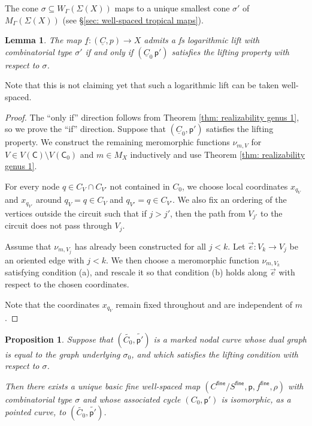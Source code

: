 \documentclass{article}
\newtheorem{proposition}[definition]{Proposition}
\newtheorem{lemma}[definition]{Lemma}
\newcommand{\tropC}{\mathsf{C}}
\begin{document}
The cone $\sigma \subseteq W_\Gamma(\Sigma(X))$ maps to a unique smallest cone $\sigma'$ of $M_{\Gamma}(\Sigma(X))$ (see \S\ref{sec: well-spaced tropical maps}).




\begin{lemma} \label{lem: liftingtrees}
    The map $\underline{f}: (\underline{C},p) \rightarrow X$ admits a fs logarithmic lift with combinatorial type $\sigma'$ if and only if $(\underline{C}_0\, \mathsf{p}')$ satisfies the lifting property with respect to $\sigma$. 
\end{lemma}

Note that this is not claiming yet that such a logarithmic lift can be taken well-spaced.

\begin{proof}
The ``only if'' direction follows from Theorem \ref{thm: realizability genus 1}, so we prove the ``if'' direction. Suppose that \((\underline{C}_0, \mathsf{p}')\) satisfies the lifting property. We construct the remaining meromorphic functions \(\nu_{m,V}\) for \(V \in V(\tropC) \setminus V(\tropC_0)\) and \(m \in M_X\) inductively and use Theorem \ref{thm: realizability genus 1}.

For every node \(q \in C_V \cap C_{V'}\) not contained in \(C_0\), we choose local coordinates \(x_{q_V}\) and \(x_{q_{V'}}\) around \(q_V = q \in C_V\) and \(q_{V'} = q \in C_{V'}\). We also fix an ordering of the vertices outside the circuit such that if \(j > j'\), then the path from \(V_{j'}\) to the circuit does not pass through \(V_j\).

Assume that \(\nu_{m,V_j}\) has already been constructed for all \(j < k\). Let \(\vec{e} : V_k \to V_j\) be an oriented edge with \(j < k\). We then choose a meromorphic function \(\nu_{m,V_k}\) satisfying condition (a), and rescale it so that condition (b) holds along \(\vec{e}\) with respect to the chosen coordinates.

Note that the coordinates \(x_{q_V}\) remain fixed throughout and are independent of \(m\).
    
   
\end{proof}



\begin{proposition}\label{prop: reduce to nbhd}
Suppose that $(\widetilde{C_0}, \widetilde{\mathsf{p}'})$ is a marked nodal curve whose dual graph is equal to the graph underlying $\sigma_0$, and which satisfies the lifting condition with respect to $\sigma$. 

Then there exists a unique basic fine well-spaced map  $(C^{\mathsf{fine}}/S^{\mathsf{fine}}, \mathsf{p}, f^{\mathsf{fine}}, \rho)$ with combinatorial type $\sigma$ and whose associated cycle $(C_0, \mathsf{p}')$ is isomorphic, as a pointed curve, to $(\widetilde{C_0}, \widetilde{\mathsf{p}'})$.
\end{proposition}
\end{document}
